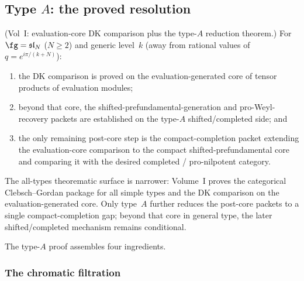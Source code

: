 \subsection{Type $A$: the proved resolution}

\begin{theorem}
\textup{(Vol~I: evaluation-core DK comparison plus the type-$A$
reduction theorem.)}
For $\fg=\mathfrak{sl}_N$ ($N\ge 2$) and generic level~$k$
(away from rational values of $q=e^{i\pi/(k+N)}$):
\begin{enumerate}[label=(\roman*)]
\item the DK comparison is proved on the evaluation-generated core of
 tensor products of evaluation modules;
\item beyond that core, the shifted-prefundamental-generation and
 pro-Weyl-recovery packets are established on the type-$A$
 shifted/completed side; and
\item the only remaining post-core step is the compact-completion
 packet extending the evaluation-core comparison to the compact
 shifted-prefundamental core and comparing it with the desired
 completed / pro-nilpotent category.
\end{enumerate}
\end{theorem}

The all-types theorematic surface is narrower: Volume~I proves the
categorical Clebsch--Gordan package for all simple types and the DK
comparison on the evaluation-generated core. Only type~$A$ further
reduces the post-core packets to a single compact-completion gap;
beyond that core in general type, the later shifted/completed
mechanism remains conditional.

The type-$A$ proof assembles four ingredients.

\subsubsection{The chromatic filtration}

